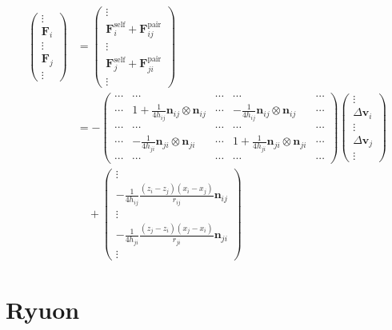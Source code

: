 \documentclass[12pt]{article}
\begin{document}
\begin{align}
\begin{pmatrix}
\vdots \\ \bm{F}_i \\ \vdots \\ \bm{F}_j \\  \vdots  
\end{pmatrix}
& =
\begin{pmatrix}
\vdots \\
\bm{F}_{i}^{\mathrm{self}} +  \bm{F}_{ij}^{\mathrm{pair}}  
\\ \vdots \\ 
\bm{F}_{j}^{\mathrm{self}} +  \bm{F}_{ji}^{\mathrm{pair}}  
\\  \vdots  
\end{pmatrix} \\
&=
-
\begin{pmatrix}
\cdots & \cdots & \cdots & \cdots & \cdots\\
\cdots & 1 + \frac{1}{4h_{ij}}\bm{n}_{ij} \otimes \bm{n}_{ij}  
& \cdots & -\frac{1}{4h_{ij}}\bm{n}_{ij} \otimes \bm{n}_{ij}   & \cdots\\
\cdots & \cdots & \cdots & \cdots & \cdots\\
\cdots & -\frac{1}{4h_{ji}}\bm{n}_{ji} \otimes \bm{n}_{ji} & \cdots 
& 1 + \frac{1}{4h_{ji}}\bm{n}_{ji} \otimes \bm{n}_{ji} 
 & \cdots \\
\cdots & \cdots & \cdots & \cdots & \cdots 
\end{pmatrix}
\begin{pmatrix}
\vdots \\
\Delta \bm{v}_i \\ 
\vdots \\
\Delta \bm{v}_j \\
\vdots 
\end{pmatrix} \\
& \quad 
+ 
\begin{pmatrix}
\vdots \\
-\frac{1}{4h_{ij}}
 \frac{(z_i - z_j )(x_i-x_j)}{r_{ij}} 
 \bm{n}_{ij} \\
\vdots \\
-\frac{1}{4h_{ji}} 
 \frac{(z_j - z_i )(x_j - x_i)}{r_{ji}} 
\bm{n}_{ji} \\
\vdots 
\end{pmatrix} 
\end{align}

\section{Ryuon}
\end{document}
